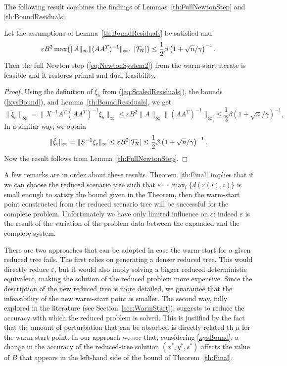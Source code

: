 The following result combines the findings of Lemmas~\ref{th:FullNewtonStep} 
and \ref{th:BoundResiduals}. 
%
\begin{theorem}  \label{th:Final}
Let the assumptions of Lemma~\ref{th:BoundResiduals} be satisfied and 
\[
\varepsilon B^2 \max\{\|A\|_\infty\|(AA^T)^{-1}\|_\infty, \; |\mathcal{T}_\mathcal{R}|\} 
   \le \frac{1}{2} \beta \left(1+\sqrt{n} / \gamma \right)^{-1}.
\]
Then the full Newton step (\ref{eq:NewtonSystem2})
from the warm-start iterate is feasible 
and it restores primal and dual feasibility.
\end{theorem}
%
\begin{proof}
Using the definition of $\tilde{\xi}_b$ from (\ref{eq:ScaledResiduals}),
the bounds (\ref{xysBound}), and Lemma~\ref{th:BoundResiduals}, we get
\[
\| \tilde{\xi}_b \|_{\infty} = \| X^{-1} A^T (AA^T)^{-1} \xi_b \|_{\infty} 
    \le
    \varepsilon B^2 \|A\|_{\infty} \|(AA^T)^{-1}\|_{\infty} 
    \le \frac{1}{2} \beta \left(1+\sqrt{n} / \gamma \right)^{-1},
\]
In a similar way, we obtain
\[
  \| \tilde{\xi}_c \|_{\infty} = \| S^{-1} \xi_c \|_\infty
                  \le \varepsilon B^2 |\mathcal{T}_\mathcal{R}|
                  \le \frac{1}{2} \beta \left(1+\sqrt{n} / \gamma \right)^{-1}.
 \]
Now the result follows from  Lemma~\ref{th:FullNewtonStep}. 
\end{proof}

A few remarks are in order about these results.
Theorem~\ref{th:Final} implies that if we can choose the reduced
scenario tree such that $\varepsilon = \max_i\{d(r(i),i)\}$ is small enough
to satisfy the bound given in the Theorem, then the warm-start point
constructed from the reduced scenario tree will be successful for the
complete problem. Unfortunately we have only limited influence on
$\varepsilon$: indeed $\varepsilon$ is the result of the variation of
the problem data between the expanded and the complete system.

There are two approaches that can be adopted in case the warm-start
for a given reduced tree fails.
The first relies on generating a denser reduced tree. This would
directly reduce $\varepsilon$, but it would also imply solving
a bigger reduced deterministic equivalent, making the solution of the
reduced problem more expensive.
Since the description of the new reduced tree is more detailed,
we guarantee that the infeasibility of the new warm-start point
is smaller.
The second way, fully explored in the literature 
(see Section~\ref{sec:WarmStart}), suggests to reduce the accuracy
with which the reduced problem is solved. This is justified by the fact
that the amount of perturbation that can be absorbed is directly related
th $\mu$ for the warm-start point.
In our approach we see that, considering \eqref{xysBound},
a change in the accuracy of the reduced-tree solution $(x^*, y^*, s^*)$
affects the value of $B$ that appears in the left-hand side of
the bound of Theorem~\ref{th:Final}.


